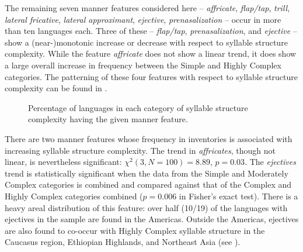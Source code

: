   The remaining seven manner features considered here -- \textit{affricate}, \textit{flap/tap}, \textit{trill}, \textit{lateral fricative}, \textit{lateral approximant}, \textit{ejective}, \textit{prenasalization} -- occur in more than ten languages each. Three of these --  \textit{flap/tap}, \textit{prenasalization}, and \textit{ejective} -- show a (near-)monotonic increase or decrease with respect to syllable structure complexity. While the feature \textit{affricate} does not show a linear trend, it does show a large overall increase in frequency between the Simple and Highly Complex categories. The patterning of these four features with respect to syllable structure complexity can be found in .

\begin{figure}
\caption{\label{fig:4.13}Percentage of languages in each category of syllable structure complexity having the given manner feature.}
\end{figure}

  There are two manner features whose frequency in inventories is associated with increasing syllable structure complexity. The trend in \textit{affricates}, though not linear, is nevertheless significant: $\chi^2(3, N = 100) = 8.89$, $p = 0.03$. The \textit{ejectives} trend is statistically significant when the data from the Simple and Moderately Complex categories is combined and compared against that of the Complex and Highly Complex categories combined ($p =0.006$ in Fisher’s exact test). There is a heavy areal distribution of this feature: over half (10/19) of the languages with ejectives in the sample are found in the Americas. Outside the Americas, ejectives are also found to co-occur with Highly Complex syllable structure in the Caucasus region, Ethiopian Highlands, and Northeast Asia (see ).



